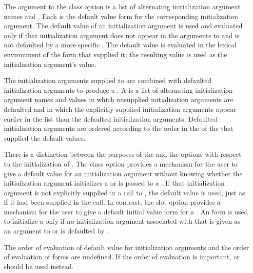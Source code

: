 The argument to the  class 
option is a list of
alternating initialization argument names and .  
Each  is the
default  value form for the corresponding initialization
argument.  The default  value  of an initialization
argument is used and evaluated only if that initialization argument
does not appear in the arguments to  and is not
defaulted by a more specific .  The default  value  is
evaluated in the lexical environment of the  form that
supplied it; the resulting value is used as the initialization
argument's value.
                                          
The initialization arguments supplied to  are combined
with defaulted initialization arguments to produce a 
. A 
is a list of alternating initialization argument names and
values in which unsupplied initialization arguments are defaulted and in
which the explicitly supplied initialization arguments appear earlier in
the list than the defaulted initialization arguments.  Defaulted
initialization arguments are ordered according to the order in the 
 of the  that supplied the default values.
                                                    
There is a distinction between the purposes of the 
 and the  options with respect to the
initialization of .  The  
class option
provides a mechanism for the user to give a default  value 
for an initialization argument without knowing whether the
initialization argument initializes a  
or is passed to a .
If that initialization argument is not explicitly supplied in a call
to , the default  value  is used, just
as if it had been supplied in the call.  In contrast, the 
 slot option provides a mechanism for the user to give a
default initial value form for a .  An  form is
used to initialize a  only if no initialization argument
associated with that  is given as an argument to 
 or is defaulted by .

The order of evaluation of default value  for initialization
arguments and the order of evaluation of  forms are
undefined.  If the order of evaluation is important, 
 or   
should be used
instead.

